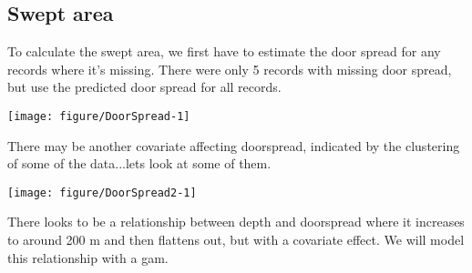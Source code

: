 \documentclass[12pt]{article}\usepackage[]{graphicx}\usepackage[]{color}
\makeatletter
\def\maxwidth{ %
  \ifdim\Gin@nat@width>\linewidth
    \linewidth
  \else
    \Gin@nat@width
  \fi
}
\newenvironment{kframe}{%
 \def\at@end@of@kframe{}%
 \ifinner\ifhmode%
  \def\at@end@of@kframe{\end{minipage}}%
  \begin{minipage}{\columnwidth}%
 \fi\fi%
 \def\FrameCommand##1{\hskip\@totalleftmargin \hskip-\fboxsep
 \colorbox{shadecolor}{##1}\hskip-\fboxsep
     \hskip-\linewidth \hskip-\@totalleftmargin \hskip\columnwidth}%
 \MakeFramed {\advance\hsize-\width
   \@totalleftmargin\z@ \linewidth\hsize
   \@setminipage}}%
 {\par\unskip\endMakeFramed%
 \at@end@of@kframe}
\newenvironment{knitrout}{}{} %
\makeatother
\begin{document}
\subsection{Swept area}

To calculate the swept area, we first have to estimate the door spread for any
records where it's missing. There were only 5 records with missing door spread,
but use the predicted door spread for all records. \\

\begin{knitrout}\footnotesize
{}\color{fgcolor}

{\centering \texttt{[image: figure/DoorSpread-1]} 

}



\end{knitrout}

There may be another covariate affecting doorspread, indicated by the
clustering of some of the data...lets look at some of them.

\begin{knitrout}\footnotesize
{}\color{fgcolor}\begin{kframe}


{\ttfamily\noindent\color{warningcolor}{\#\# Warning: Removed 955 rows containing missing values (geom\_point).}}

{\ttfamily\noindent\color{warningcolor}{\#\# Warning: Removed 955 rows containing missing values (geom\_point).}}

{\ttfamily\noindent\color{warningcolor}{\#\# Warning: Removed 955 rows containing missing values (geom\_point).}}

{\ttfamily\noindent\color{warningcolor}{\#\# Warning: Removed 955 rows containing missing values (geom\_point).}}\end{kframe}

{\centering \texttt{[image: figure/DoorSpread2-1]} 

}



\end{knitrout}

There looks to be a relationship between depth and doorspread where it
increases to around 200 m and then flattens out, but with a covariate effect.
We will model this relationship with a gam. 
\end{document}
